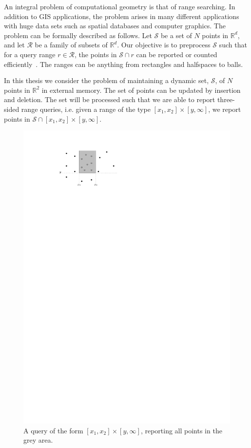 \documentclass[twoside,11pt,openright]{report}
\begin{document}
An integral problem of computational geometry is that of range searching. In addition to GIS applications, the problem arises in many different applications with huge data sets such as spatial databases and computer graphics. The problem can be formally described as follows. Let $\mathcal{S}$ be a set of $N$ points in $\mathbb{R}^d$, and let $\mathcal{R}$ be a family of subsets of $\mathbb{R}^d$. Our objective is to preprocess $\mathcal{S}$ such that for a query range $r \in \mathcal{R}$, the points in $\mathcal{S} \cap r$ can be reported or counted efficiently~\cite{Agarwal99geometricrange}. The ranges can be anything from rectangles and halfspaces to balls.

In this thesis we consider the problem of maintaining a dynamic set, $\mathcal{S}$, of $N$ points in $\mathbb{R}^2$ in external memory. The set of points can be updated by insertion and deletion. The set will be processed such that we are able to report three-sided range queries, i.e. given a range of the type $[x_1,x_2] \times [y,\infty]$, we report points in $\mathcal{S} \cap [x_1,x_2] \times [y,\infty]$.

\begin{figure}[h]
	\centering
	\includegraphics[scale=1]{../figures/three-sided-query}
	\caption{A query of the form $[x_1,x_2] \times [y,\infty]$, reporting all points in the grey area.}
	\label{fig:three-sided-query}
\end{figure}
 
\end{document}
